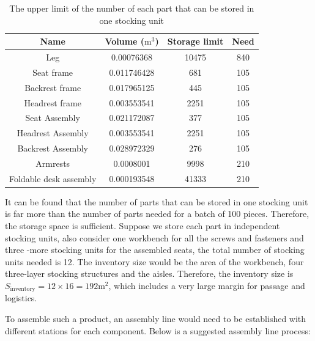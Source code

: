 \begin{table}[!htp]
    \centering
    \caption{The upper limit of the number of each part that can be stored in one stocking unit}
    \label{tab:stocking unit}
    \begin{tabular}{cccc} \toprule
        Name                   & Volume ($\mathrm{m^3}$) & Storage limit & Need \\
        \midrule
        Leg                    & 0.00076368                    & 10475    & 840  \\
        Seat frame             & 0.011746428                   & 681      & 105  \\
        Backrest frame         & 0.017965125                   & 445      & 105  \\
        Headrest frame         & 0.003553541                   & 2251     & 105  \\
        Seat Assembly          & 0.021172087                   & 377      & 105  \\
        Headrest Assembly      & 0.003553541                   & 2251     & 105  \\
        Backrest Assembly      & 0.028972329                   & 276      & 105  \\
        Armrests               & 0.0008001                     & 9998     & 210  \\
        Foldable desk assembly & 0.000193548                   & 41333    & 210  \\
        \bottomrule
    \end{tabular}
\end{table}

It can be found that the number of parts that can be stored in one stocking unit is far more than the number of parts needed for a batch of 100 pieces. Therefore, the storage space is sufficient. Suppose we store each part in independent stocking units, also consider one workbench for all the screws and fasteners and three -more stocking units for the assembled seats, the total number of stocking units needed is 12. The inventory size would be the area of the workbench, four three-layer stocking structures and the aisles. Therefore, the inventory size is $S_\mathrm{inventory}=12\times16=192\mathrm{m^2}$, which includes a very large margin for passage and logistics.

To assemble such a product, an assembly line would need to be established with different stations for each component. Below is a suggested assembly line process:

